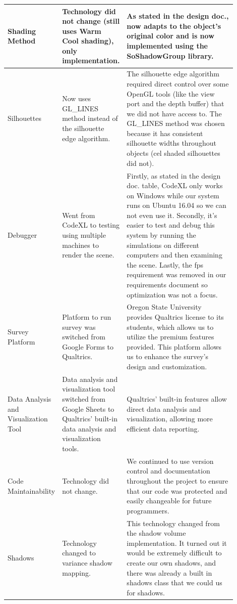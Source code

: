 \documentclass[10pt,journal,compsoc,draftclsnofoot]{IEEEtran}
\begin{document}
\begin{flushleft}
\begin{center}
\begin{table}[H]
\begin{tabular}{ | p{0.2\linewidth} | p{0.2\linewidth} | p{0.5\linewidth} | }
Shading Method & 
Technology did not change (still uses Warm Cool shading), only implementation. & 
As stated in the design doc., now adapts to the object's original color and is now implemented using the SoShadowGroup library. \\ \hline
Silhouettes &
Now uses GL\_LINES method instead of the silhouette edge algorithm. &
The silhouette edge algorithm required direct control over some OpenGL tools (like the view port and the depth buffer) that we did not have access to.
The GL\_LINES method was chosen because it has consistent silhouette widths throughout objects (cel shaded silhouettes did not). \\ \hline
Debugger  &
Went from CodeXL to testing using multiple machines to render the scene. &
Firstly, as stated in the design doc. table, CodeXL only works on Windows while our system runs on Ubuntu 16.04 so we can not even use it.
Secondly, it's easier to test and debug this system by running the simulations on different computers and then examining the scene.
Lastly, the fps requirement was removed in our requirements document so optimization was not a focus. \\ \hline
Survey Platform  &
Platform to run survey was switched from Google Forms to Qualtrics. &
Oregon State University provides Qualtrics license to its students, which allows us to utilize the premium features provided.
This platform allows us to enhance the survey's design and customization. \\ \hline
Data Analysis and Visualization Tool &
Data analysis and visualization tool switched from Google Sheets to Qualtrics' built-in data analysis and visualization tools. &
Qualtrics' built-in features allow direct data analysis and visualization, allowing more efficient data reporting. \\ \hline
Code Maintainability &
Technology did not change. &
We continued to use version control and documentation throughout the project to ensure that our code was protected and easily changeable for future programmers. \\ \hline
Shadows &
Technology changed to variance shadow mapping. &
This technology changed from the shadow volume implementation.
It turned out it would be extremely difficult to create our own shadows, and there was already a built in shadows class that we could us for shadows. \\ \hline


\end{tabular}
\newline
\label{table:TechReviewUpdate}
\end{table}
\end{center}


\end{flushleft}
\end{document}
